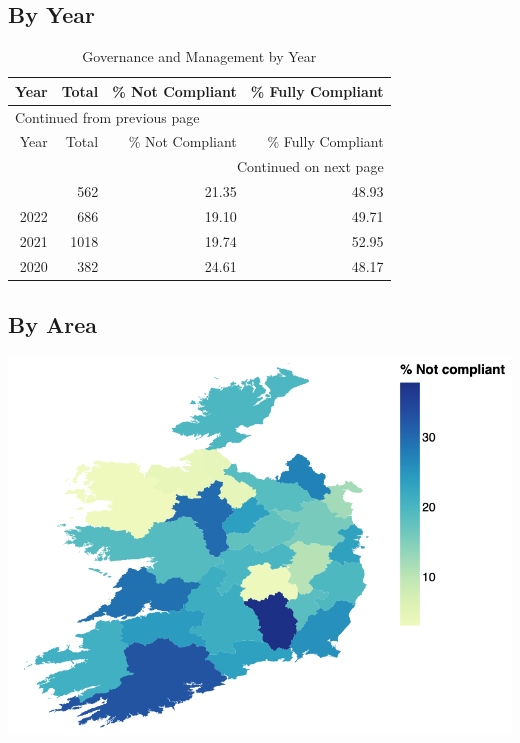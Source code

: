 \documentclass[a4paper,11pt,twoside]{article}
\begin{document}
\subsection{By Year}
\label{sec:org222e6bc}
\begin{longtable}{rrrr}
\caption{Governance and Management by Year}
\\[0pt]
Year & Total & \% Not Compliant & \% Fully Compliant\\[0pt]
\hline
\endfirsthead
\multicolumn{4}{l}{Continued from previous page} \\[0pt]
\hline

Year & Total & \% Not Compliant & \% Fully Compliant \\[0pt]

\hline
\endhead
\hline\multicolumn{4}{r}{Continued on next page} \\
\endfoot
\endlastfoot
\hline
2023 & 562 & 21.35 & 48.93\\[0pt]
2022 & 686 & 19.10 & 49.71\\[0pt]
2021 & 1018 & 19.74 & 52.95\\[0pt]
2020 & 382 & 24.61 & 48.17\\[0pt]
\end{longtable}
\subsection{By Area}
\label{sec:org2eefaeb}
\begin{center}
\includegraphics[width=.9\linewidth]{img/11_1_reg_23_percent_notitle.png}
\end{center}
\end{document}
